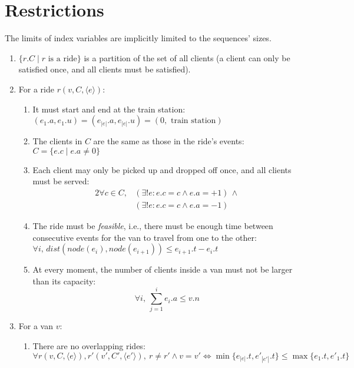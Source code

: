 \section{Restrictions} \label{problem-formalization-restrictions}
The limits of index variables are implicitly limited to the sequences' sizes.
\begin{enumerate}
    \item $\{r.C \mid r \text{ is a ride}\}$ is a partition of the set of all clients (a client can only be satisfied once, and all clients must be satisfied).
    \item For a ride $r(v,C,\langle e \rangle)$:
    \begin{enumerate}
        \item It must start and end at the train station: $(e_1.a, e_1.u) = (e_{|e|}.a,e_{|e|}.u)=(0, \text{ train station})$
        \item The clients in $C$ are the same as those in the ride's events: $C=\{e.c \mid e.a \neq 0\}$
        \item Each client may only be picked up and dropped off once, and all clients must be served:
        \begin{alignat*}{2}
            \forall c \in C,
            &(\exists !e: e.c = c \wedge e.a = +1)\,\wedge \\
            &(\exists !e: e.c = c \wedge e.a = -1)
        \end{alignat*}
        \item The ride must be \emph{feasible}, i.e., there must be enough time between consecutive events for the van to travel from one to the other: $\forall i,\,dist(node(e_i), node(e_{i+1})) \leq e_{i+1}.t - e_i.t$
        \item At every moment, the number of clients inside a van must not be larger than its capacity:
        \begin{equation*}
            \forall i,~\sum_{j=1}^{i}{e_i.a} \leq v.n
        \end{equation*}
    \end{enumerate}
    \item For a van $v$:
    \begin{enumerate}
        \item \label{itm:van-restriction} There are no overlapping rides:
        \begin{equation*}
            \forall r(v,C,\langle e \rangle), r'(v',C',\langle e' \rangle),~r \neq r' \wedge v = v' \iff \min\{e_{|e|}.t,e'_{|e'|}.t\} \leq \max\{e_1.t,e'_1.t\}
        \end{equation*}
    \end{enumerate}
\end{enumerate}
